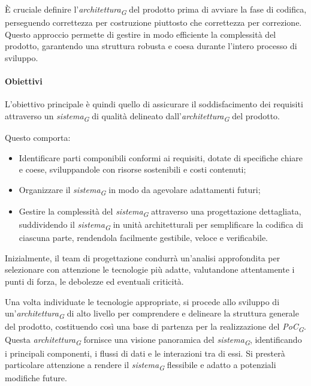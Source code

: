 È cruciale definire l'\textit{architettura}\textsubscript{\textit{G}} del prodotto prima di avviare la fase di codifica, perseguendo correttezza per costruzione piuttosto che correttezza per correzione. Questo approccio permette di gestire in modo efficiente la complessità del prodotto, garantendo una struttura robusta e coesa durante l'intero processo di sviluppo.

\paragraph{Obiettivi}
L'obiettivo principale è quindi quello di assicurare il soddisfacimento dei requisiti attraverso un \textit{sistema}\textsubscript{\textit{G}} di qualità delineato dall'\textit{architettura}\textsubscript{\textit{G}} del prodotto.

Questo comporta:
\begin{itemize}
    \item Identificare parti componibili conformi ai requisiti, dotate di specifiche chiare e coese, sviluppandole con risorse sostenibili e costi contenuti;
    \item Organizzare il \textit{sistema}\textsubscript{\textit{G}} in modo da agevolare adattamenti futuri;
    \item Gestire la complessità del \textit{sistema}\textsubscript{\textit{G}} attraverso una progettazione dettagliata, suddividendo il \textit{sistema}\textsubscript{\textit{G}} in unità architetturali per semplificare la codifica di ciascuna parte, rendendola facilmente gestibile, veloce e verificabile.
\end{itemize}
Inizialmente, il team di progettazione condurrà un'analisi approfondita per selezionare con attenzione le tecnologie più adatte, valutandone attentamente i punti di forza, le debolezze ed eventuali criticità.

\vspace{0.2cm}

Una volta individuate le tecnologie appropriate, si procede allo sviluppo di un'\textit{architettura}\textsubscript{\textit{G}} di alto livello per comprendere e delineare la struttura generale del prodotto, costituendo così una base di partenza per la realizzazione del \textit{PoC}\textsubscript{\textit{G}}.
Questa \textit{architettura}\textsubscript{\textit{G}} fornisce una visione panoramica del \textit{sistema}\textsubscript{\textit{G}}, identificando i principali componenti, i flussi di dati e le interazioni tra di essi. Si presterà particolare attenzione a rendere il \textit{sistema}\textsubscript{\textit{G}} flessibile e adatto a potenziali modifiche future.

